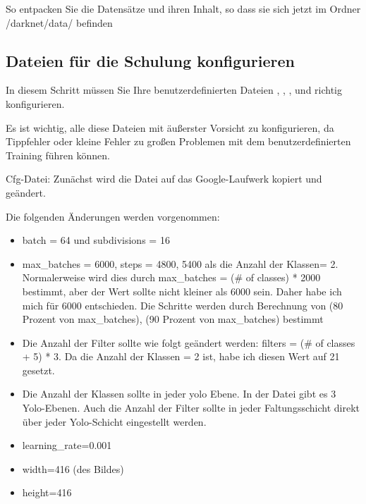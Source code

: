 So entpacken Sie die Datensätze und ihren Inhalt, so dass sie sich jetzt im Ordner \glqq /darknet/data/\grqq{} befinden

\medskip


\medskip


\subsection{Dateien für die Schulung konfigurieren}

In diesem Schritt müssen Sie Ihre benutzerdefinierten Dateien , , ,  und  richtig konfigurieren.

Es ist wichtig, alle diese Dateien mit äußerster Vorsicht zu konfigurieren, da Tippfehler oder kleine Fehler zu großen Problemen mit dem benutzerdefinierten Training führen können.

Cfg-Datei: Zunächst wird die Datei  auf das Google-Laufwerk kopiert und geändert. 

Die folgenden Änderungen werden vorgenommen: 

\begin{itemize}
  \item batch = 64 und subdivisions = 16
  \item max{\_}batches = 6000, steps = 4800, 5400 als die Anzahl der Klassen= 2. Normalerweise wird dies durch max{\_}batches = (\# of classes) * 2000 bestimmt, aber der Wert sollte nicht kleiner als 6000 sein. Daher habe ich mich für 6000 entschieden. Die Schritte werden durch Berechnung von (80 Prozent von max{\_}batches), (90 Prozent von max{\_}batches) bestimmt
  \item Die Anzahl der Filter sollte wie folgt geändert werden: filters = (\# of classes + 5) * 3. Da die Anzahl der Klassen = 2 ist, habe ich diesen Wert auf 21 gesetzt. 
  \item Die Anzahl der Klassen sollte in jeder \ac{yolo} Ebene. In der Datei  gibt es 3 Yolo-Ebenen. Auch die Anzahl der Filter sollte in jeder Faltungsschicht direkt über jeder Yolo-Schicht eingestellt werden.
  \item learning{\_}rate=0.001
  \item width=416 (des Bildes)
  \item height=416 
\end{itemize}

